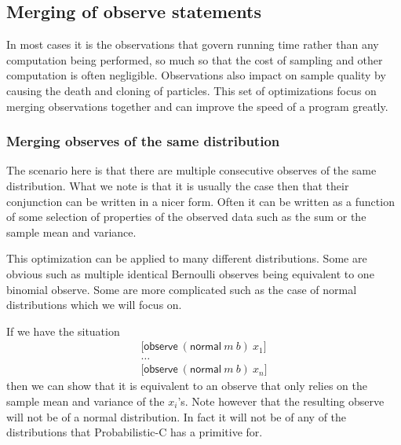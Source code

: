 \documentclass[a4paper]{article}
\begin{document}

\subsection{Merging of observe statements}

In most cases it is the observations that govern running time rather than any computation being performed, so much so that the cost of sampling and other computation is often negligible. Observations also impact on sample quality by causing the death and cloning of particles. This set of optimizations focus on merging observations together and can improve the speed of a program greatly.




\subsubsection{Merging observes of the same distribution}

The scenario here is that there are multiple consecutive observes of the same distribution. What we note is that it is usually the case then that their conjunction can be written in a nicer form. Often it can be written as a function of some selection of properties of the observed data such as the sum or the sample mean and variance.

This optimization can be applied to many different distributions. Some are obvious such as multiple identical Bernoulli observes being equivalent to one binomial observe. Some are more complicated such as the case of normal distributions which we will focus on.

If we have the situation
\[
	\begin{array}{l}
		\lbrack \mathsf{observe}\ (\mathsf{normal}\ m\ b)\ x_1 \rbrack \\
		\dots \\
		\lbrack \mathsf{observe}\ (\mathsf{normal}\ m\ b)\ x_n \rbrack
	\end{array}
\]
then we can show that it is equivalent to an observe that only relies on the sample mean and variance of the \(x_i\)'s. Note however that the resulting observe will not be of a normal distribution. In fact it will not be of any of the distributions that Probabilistic-C has a primitive for.
\end{document}
